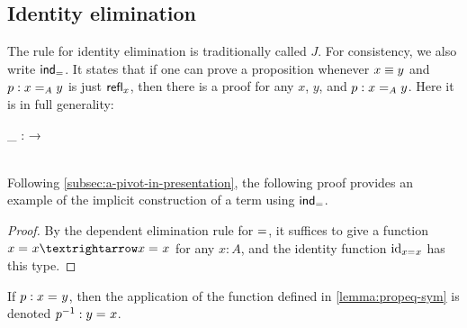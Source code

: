\documentclass[./thesis.tex]{subfiles}
\begin{document}
\subsection{Identity elimination}
\label{subsec:identity-elimination}

The rule for identity elimination is traditionally called $J$. For consistency,
we also write $\ind_{\propeqsign}$. It states that if one can prove a
proposition whenever $x\jdeq y$ and $p:\propeq{A}{x}{y}$ is just $\refl{x}$,
then there is a proof for any $x$, $y$, and $p:\propeq{A}{x}{y}$.
Here it is in full generality:
\begin{gatherjot}
	\ind_{\propeqsign} : 
                        {
                          {
                          →}} \\ \\
   \jdeq {}
\end{gatherjot}


Following \cref{subsec:a-pivot-in-presentation}, the following proof provides
an example of the implicit construction of a term using $\ind_{\propeqsign}$.

\begin{proof}
  By the dependent elimination rule for $\propeqsign$, it suffices to give a
  function $\propeq{}{x}{x}→\propeq{}{x}{x}$ for any $x:A$, and the identity
  function $\id_{\propeq{}{x}{x}}$ has this type.
\end{proof}

If $p:\propeq{}{x}{y}$, then the application of
the function defined in \cref{lemma:propeq-sym} is denoted
$p^{-1}:\propeq{}{y}{x}$. 
\end{document}
